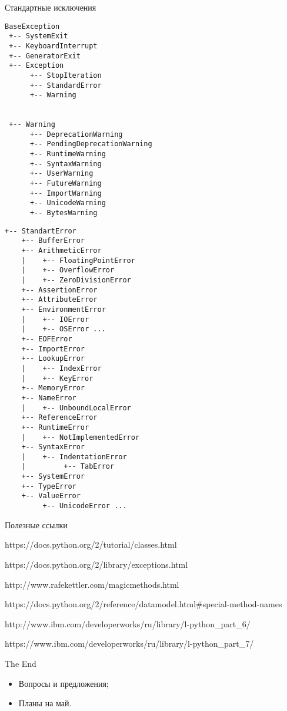 \documentclass[hyperref={pdftex,unicode}]{beamer}
\begin{document}
\begin{frame}[fragile]{Стандартные исключения}
\begin{minipage}{0.45\linewidth}
  \begin{lstlisting}[basicstyle=\tiny\ttfamily]
BaseException
 +-- SystemExit
 +-- KeyboardInterrupt
 +-- GeneratorExit
 +-- Exception
      +-- StopIteration
      +-- StandardError
      +-- Warning


 +-- Warning
      +-- DeprecationWarning
      +-- PendingDeprecationWarning
      +-- RuntimeWarning
      +-- SyntaxWarning
      +-- UserWarning
      +-- FutureWarning
      +-- ImportWarning
      +-- UnicodeWarning
      +-- BytesWarning
\end{lstlisting}
\end{minipage}
\hfill
\begin{minipage}{0.5\linewidth}
  \begin{lstlisting}[basicstyle=\tiny\ttfamily]
+-- StandartError
    +-- BufferError
    +-- ArithmeticError
    |    +-- FloatingPointError
    |    +-- OverflowError
    |    +-- ZeroDivisionError
    +-- AssertionError
    +-- AttributeError
    +-- EnvironmentError
    |    +-- IOError
    |    +-- OSError ...
    +-- EOFError
    +-- ImportError
    +-- LookupError
    |    +-- IndexError
    |    +-- KeyError
    +-- MemoryError
    +-- NameError
    |    +-- UnboundLocalError
    +-- ReferenceError
    +-- RuntimeError
    |    +-- NotImplementedError
    +-- SyntaxError
    |    +-- IndentationError
    |         +-- TabError
    +-- SystemError
    +-- TypeError
    +-- ValueError
         +-- UnicodeError ...
\end{lstlisting}
\end{minipage}
\end{frame}

\begin{frame}{Полезные ссылки}
  \begin{itemize}
    \item https://docs.python.org/2/tutorial/classes.html
    \item https://docs.python.org/2/library/exceptions.html
    \item http://www.rafekettler.com/magicmethods.html
      \scriptsize{
      \item https://docs.python.org/2/reference/datamodel.html\#special-method-names
      \item http://www.ibm.com/developerworks/ru/library/l-python\_part\_6/
      \item https://www.ibm.com/developerworks/ru/library/l-python\_part\_7/ 
      }
  \end{itemize}
\end{frame}

\begin{frame}{The End}
  \begin{itemize}
  \item Вопросы и предложения;
  \item Планы на май.
  \end{itemize}
\end{frame}
\end{document}
